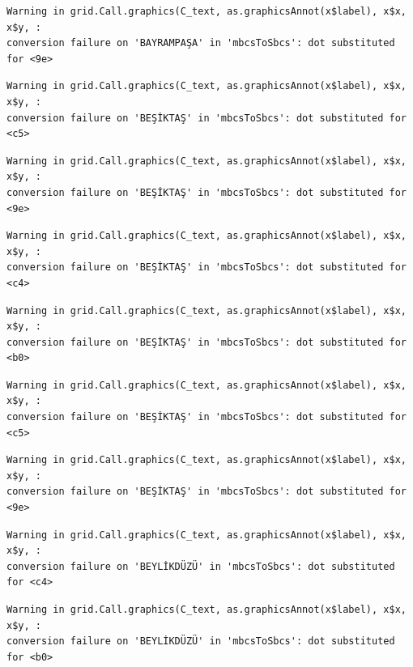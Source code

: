 \documentclass[
  11pt,
  a4paper,
  DIV=11,
  numbers=noendperiod]{scrartcl}
\begin{document}
\begin{verbatim}
Warning in grid.Call.graphics(C_text, as.graphicsAnnot(x$label), x$x, x$y, :
conversion failure on 'BAYRAMPAŞA' in 'mbcsToSbcs': dot substituted for <9e>
\end{verbatim}

\begin{verbatim}
Warning in grid.Call.graphics(C_text, as.graphicsAnnot(x$label), x$x, x$y, :
conversion failure on 'BEŞİKTAŞ' in 'mbcsToSbcs': dot substituted for <c5>
\end{verbatim}

\begin{verbatim}
Warning in grid.Call.graphics(C_text, as.graphicsAnnot(x$label), x$x, x$y, :
conversion failure on 'BEŞİKTAŞ' in 'mbcsToSbcs': dot substituted for <9e>
\end{verbatim}

\begin{verbatim}
Warning in grid.Call.graphics(C_text, as.graphicsAnnot(x$label), x$x, x$y, :
conversion failure on 'BEŞİKTAŞ' in 'mbcsToSbcs': dot substituted for <c4>
\end{verbatim}

\begin{verbatim}
Warning in grid.Call.graphics(C_text, as.graphicsAnnot(x$label), x$x, x$y, :
conversion failure on 'BEŞİKTAŞ' in 'mbcsToSbcs': dot substituted for <b0>
\end{verbatim}

\begin{verbatim}
Warning in grid.Call.graphics(C_text, as.graphicsAnnot(x$label), x$x, x$y, :
conversion failure on 'BEŞİKTAŞ' in 'mbcsToSbcs': dot substituted for <c5>
\end{verbatim}

\begin{verbatim}
Warning in grid.Call.graphics(C_text, as.graphicsAnnot(x$label), x$x, x$y, :
conversion failure on 'BEŞİKTAŞ' in 'mbcsToSbcs': dot substituted for <9e>
\end{verbatim}

\begin{verbatim}
Warning in grid.Call.graphics(C_text, as.graphicsAnnot(x$label), x$x, x$y, :
conversion failure on 'BEYLİKDÜZÜ' in 'mbcsToSbcs': dot substituted for <c4>
\end{verbatim}

\begin{verbatim}
Warning in grid.Call.graphics(C_text, as.graphicsAnnot(x$label), x$x, x$y, :
conversion failure on 'BEYLİKDÜZÜ' in 'mbcsToSbcs': dot substituted for <b0>
\end{verbatim}
\end{document}
